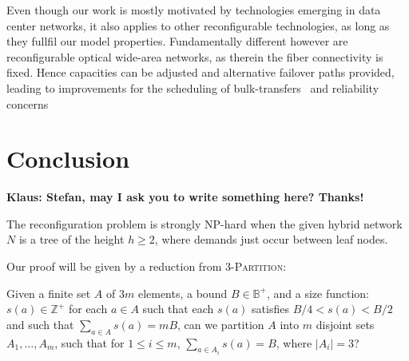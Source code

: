 \documentclass[sigconf]{acmart}
\newcommand\klaus[1]{\color{olive}\textbf{Klaus: #1}\color{black}}
\begin{document}
%
Even though our work is mostly motivated by technologies emerging in data center networks, it also applies to other reconfigurable technologies, as long as they fullfil our model properties.
%
Fundamentally different however are reconfigurable optical wide-area networks, as therein the fiber connectivity is fixed.
%
Hence capacities can be adjusted and alternative failover paths provided, leading to improvements for the scheduling of bulk-transfers~\cite{Jia2017a,owan,darttree} and reliability concerns~\cite{Gossels:19,radwan}



\section{Conclusion}\label{sec:conclusion}
\klaus{Stefan, may I ask you to write something here? Thanks!}










\clearpage
\balance


\clearpage
\appendix

\begin{theorem}
	The reconfiguration problem is strongly NP-hard when the given hybrid network $N$ is a tree of the height $h\ge 2$, where demands just occur between leaf nodes. 
\end{theorem}
Our proof will be given by a reduction from \textsc{$3$-Partition}:
\begin{definition}
	Given a finite set  $A$ of $3m$ elements, a bound $B\in \mathbb{B}^+$, and a size function: $s(a)\in \mathbb{Z}^+$ for each $a\in A$ such that each $s(a)$ satisfies $B/4< s(a)< B/2$ and such that $\sum_{a\in A} s(a)=mB$,  can we partition $A$ into $m$ disjoint sets $A_1,\ldots, A_m$, such that for $1\leq i\leq m$, $\sum_{a\in A_i} s(a)= B$, where $\left| A_i \right|=3$? \label{def:3-partition}
\end{definition}
\end{document}
